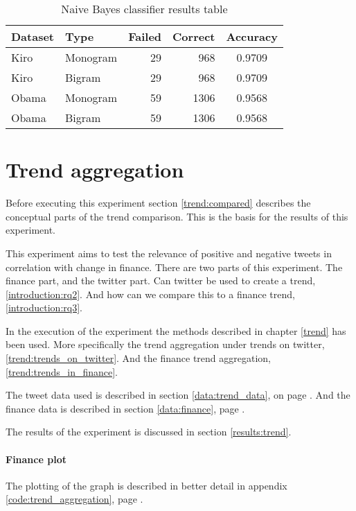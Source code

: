 \begin{table}
\centering
\label{tbl:naive_bayes_classification_results}
\caption{Naive Bayes classifier results table}
\begin{tabular}{ l l r r c }
Dataset & Type & Failed & Correct & Accuracy \\ 
\hline 
Kiro & Monogram & 29 & 968 & 0.9709 \\
Kiro & Bigram & 29 & 968 & 0.9709 \\
Obama & Monogram & 59 & 1306 & 0.9568 \\
Obama & Bigram & 59 & 1306 & 0.9568 \\
\end{tabular}
\end{table}
%

\section{Trend aggregation}\label{experiments:trend}
Before executing this experiment section \ref{trend:compared} describes the
conceptual parts of the trend comparison. This is the basis for the results of
this experiment. 

This experiment aims to test the relevance of positive and negative tweets in
correlation with change in finance. There are two parts of this experiment. The
finance part, and the twitter part. Can twitter be used to create a trend,
\ref{introduction:rq2}. And how can we compare this to a finance trend,
\ref{introduction:rq3}.

In the execution of the experiment the methods described in chapter \ref{trend}
has been used. More specifically the trend aggregation under trends on twitter,
\ref{trend:trends_on_twitter}. And the finance trend aggregation,
\ref{trend:trends_in_finance}.

The tweet data used is described in section \ref{data:trend_data}, on page
\pageref{data:trend_data}. And the finance data is described in section
\ref{data:finance}, page \pageref{data:finance}.

The results of the experiment is discussed in section \ref{results:trend}. 

\paragraph{Finance plot}
The plotting of the graph is described in better detail in appendix
\ref{code:trend_aggregation}, page \pageref{code:trend_aggregation}.

